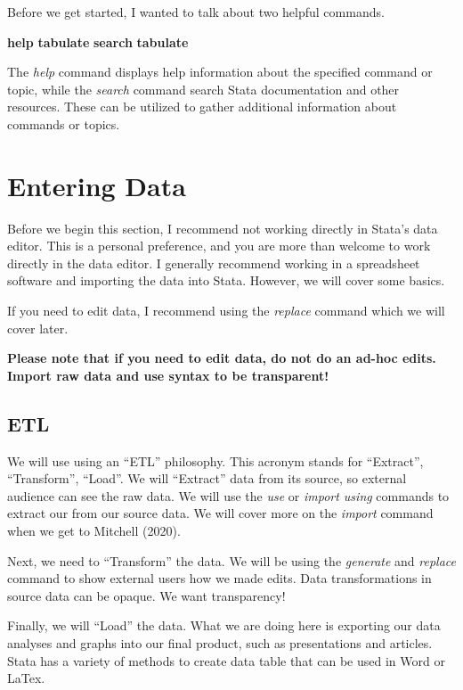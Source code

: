 \documentclass[
]{book}
\newenvironment{Shaded}{\begin{snugshade}}{\end{snugshade}}
\newcommand{\KeywordTok}[1]{\textcolor[rgb]{0.13,0.29,0.53}{\textbf{#1}}}
\begin{document}
Before we get started, I wanted to talk about two helpful commands.

\begin{Shaded}
\begin{Highlighting}[]
\KeywordTok{help} \KeywordTok{tabulate}
\KeywordTok{search} \KeywordTok{tabulate}
\end{Highlighting}
\end{Shaded}

The \emph{help} command displays help information about the specified command or topic, while the \emph{search} command search Stata documentation and other resources. These can be utilized to gather additional information about commands or topics.

\chapter{Entering Data}\label{entering-data}

Before we begin this section, I recommend not working directly in Stata's data editor. This is a personal preference, and you are more than welcome to work directly in the data editor. I generally recommend working in a spreadsheet software and importing the data into Stata. However, we will cover some basics.

If you need to edit data, I recommend using the \emph{replace} command which we will cover later.

\textbf{Please note that if you need to edit data, do not do an ad-hoc edits. Import raw data and use syntax to be transparent!}

\section{ETL}\label{etl}

We will use using an ``ETL'' philosophy. This acronym stands for ``Extract'', ``Transform'', ``Load''. We will ``Extract'' data from its source, so external audience can see the raw data. We will use the \emph{use} or \emph{import using} commands to extract our from our source data. We will cover more on the \emph{import} command when we get to Mitchell (2020).

Next, we need to ``Transform'' the data. We will be using the \emph{generate} and \emph{replace} command to show external users how we made edits. Data transformations in source data can be opaque. We want transparency!

Finally, we will ``Load'' the data. What we are doing here is exporting our data analyses and graphs into our final product, such as presentations and articles. Stata has a variety of methods to create data table that can be used in Word or LaTex.
\end{document}
